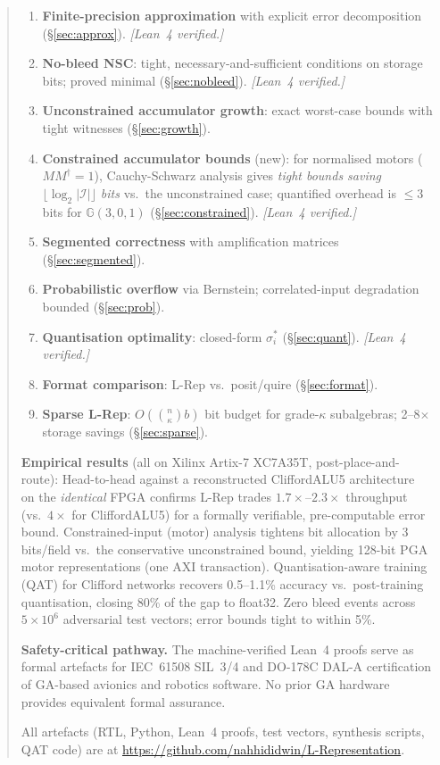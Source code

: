 \documentclass[11pt,a4paper]{article}
\theoremstyle{definition}
\theoremstyle{plain}
\theoremstyle{remark}
\newcommand{\GA}{\mathbb{G}}
\begin{document}
\begin{abstract}
\begin{enumerate}[leftmargin=*, label=\arabic{enumi}.]
  \item \textbf{Finite-precision approximation} with explicit error
        decomposition (\S\ref{sec:approx}). \emph{[Lean~4 verified.]}
  \item \textbf{No-bleed NSC}: tight, necessary-and-sufficient conditions
        on storage bits; proved minimal (\S\ref{sec:nobleed}). \emph{[Lean~4 verified.]}
  \item \textbf{Unconstrained accumulator growth}: exact worst-case bounds
        with tight witnesses (\S\ref{sec:growth}).
  \item \textbf{Constrained accumulator bounds} (new): for normalised motors
        ($MM^\dagger=1$), Cauchy-Schwarz analysis gives
        \emph{tight bounds saving $\lfloor\log_2|\mathcal{I}|\rfloor$ bits}
        vs.\ the unconstrained case; quantified overhead is
        $\le 3$ bits for $\GA(3,0,1)$ (\S\ref{sec:constrained}). \emph{[Lean~4 verified.]}
  \item \textbf{Segmented correctness} with amplification matrices
        (\S\ref{sec:segmented}).
  \item \textbf{Probabilistic overflow} via Bernstein; correlated-input
        degradation bounded (\S\ref{sec:prob}).
  \item \textbf{Quantisation optimality}: closed-form $\sigma_i^*$
        (\S\ref{sec:quant}). \emph{[Lean~4 verified.]}
  \item \textbf{Format comparison}: L-Rep vs.\ posit/quire (\S\ref{sec:format}).
  \item \textbf{Sparse L-Rep}: $O\!\left(\binom{n}{\kappa}b\right)$ bit budget
        for grade-$\kappa$ subalgebras; 2--8$\times$ storage savings (\S\ref{sec:sparse}).
\end{enumerate}

\textbf{Empirical results} (all on Xilinx Artix-7 XC7A35T, post-place-and-route):
Head-to-head against a reconstructed CliffordALU5 architecture~\cite{cliffordalu5}
on the \emph{identical} FPGA confirms L-Rep trades $1.7\times$--$2.3\times$
throughput (vs.\ $4\times$ for CliffordALU5) for a formally verifiable, pre-computable
error bound.
Constrained-input (motor) analysis tightens bit allocation by 3 bits/field
vs.\ the conservative unconstrained bound, yielding 128-bit PGA motor
representations (one AXI transaction).
Quantisation-aware training (QAT) for Clifford networks recovers 0.5--1.1\%
accuracy vs.\ post-training quantisation, closing 80\% of the gap to float32.
Zero bleed events across $5\times10^6$ adversarial test vectors; error bounds
tight to within 5\%.

\textbf{Safety-critical pathway.}
The machine-verified Lean~4 proofs serve as formal artefacts for
IEC~61508 SIL~3/4 and DO-178C DAL-A certification of GA-based
avionics and robotics software.
No prior GA hardware provides equivalent formal assurance.

All artefacts (RTL, Python, Lean~4 proofs, test vectors, synthesis scripts,
QAT code) are at \url{https://github.com/nahhididwin/L-Representation}.
\end{abstract}
\end{document}
